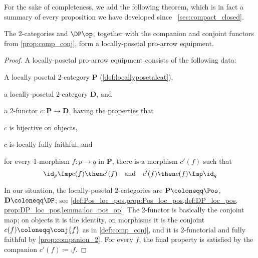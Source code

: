 For the sake of completeness, we add the following theorem, which is in fact a summary of every proposition we have developed since ~\cref{sec:compact_closed}.

\begin{theorem}
    The 2-categories \Pos and $\DP\op$, together with the companion and conjoint functors from \cref{prop:comp_conj}, form a locally-posetal pro-arrow equipment.
\end{theorem}
\begin{proof}
    A locally-posetal pro-arrow equipment consists of the following data:
    \begin{compactitem}
        \item A locally posetal 2-category $\mathbf{P}$ (\cref{def:locallyposetalcat}),
        \item a locally-posetal 2-category $\mathbf{D}$, and
        \item a 2-functor $c\colon\mathbf{P}\to\mathbf{D}$, having the properties that
        \begin{compactitem}
            \item $c$ is bijective on objects,
            \item $c$ is locally fully faithful, and
            \item for every 1-morphism $f\colon p\to q$ in $\mathbf{P}$, there is a morphism $c'(f)$ such that
            \begin{equation}
                \id_p\Imp c(f)\then c'(f)\quad\text{and}\quad c'(f)\then c(f)\Imp\id_q
            \end{equation}
        \end{compactitem}
    \end{compactitem}
    In our situation, the locally-posetal 2-categories are $\mathbf{P}\coloneqq\Pos$, $\mathbf{D}\coloneqq\DP$; see \cref{def:Pos_loc_pos,prop:Pos_loc_pos,def:DP_loc_pos, prop:DP_loc_pos,lemma:loc_pos_op}. The 2-functor is basically the conjoint map; on objects it is the identity, on morphisms it is the conjoint $c(f)\coloneqq\conj{f}$ as in \cref{def:comp_conj}, and it is 2-functorial and fully faithful by \cref{prop:companion_2}. For every $f$, the final property is satisfied by the companion $c'(f)\coloneqq \comp{f}$.
\end{proof}



